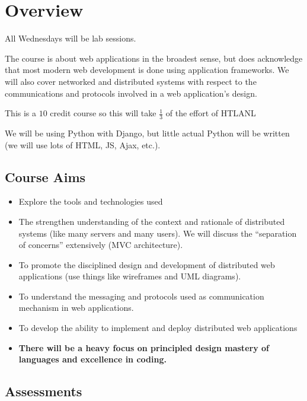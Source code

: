 \section{Overview}\label{sec:was_overview}

All Wednesdays will be lab sessions.

The course is about web applications in the broadest sense, but does acknowledge that most modern web development is done using application frameworks.
We will also cover networked and distributed systems with respect to the communications and protocols involved in a web application's design.

This is a \(10\) credit course so this will take \(\frac{1}{3}\) of the effort of HTLANL

We will be using Python with Django, but little actual Python will be written (we will use lots of HTML, JS, Ajax, etc.).

\subsection{Course Aims}\label{sub:course_aims}

\begin{itemize}
    \item Explore the tools and technologies used
    \item The strengthen understanding of the context and rationale of distributed systems (like many servers and many users).
          We will discuss the ``separation of concerns'' extensively (MVC architecture).
    \item To promote the disciplined design and development of distributed web applications (use things like wireframes and UML diagrams).
    \item To understand the messaging and protocols used as communication mechanism in web applications.
    \item To develop the ability to implement and deploy distributed web applications
    \item \textbf{There will be a heavy focus on principled design mastery of languages and excellence in coding.}
\end{itemize}

\subsection{Assessments}\label{sub:was_assessments}

